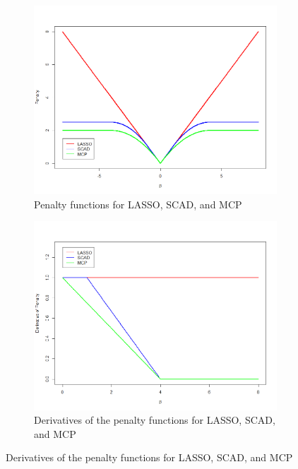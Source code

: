 \documentclass{article}
\begin{document}
\begin{figure}[!h]
	\caption{Penalty functions for LASSO, SCAD, and MCP, as well as their derivatives. These plots use $\lambda = 2$ and $a = 3$.}
	\label{fig:lasso-scad-mcp}
	\centering
	\begin{subfigure}[b]{0.4\textwidth}
		\caption{Penalty functions for LASSO, SCAD, and MCP}
		\label{fig:penalty}
		\includegraphics[width=\textwidth]{penalty.png}
	\end{subfigure}
	\hspace{30pt}
	\begin{subfigure}[b]{0.4\textwidth}
		\caption{Derivatives of the penalty functions for LASSO, SCAD, and MCP}
		\label{fig:derivative}
		\includegraphics[width=\textwidth]{derivative.png}
	\end{subfigure}
\end{figure}
\end{document}
